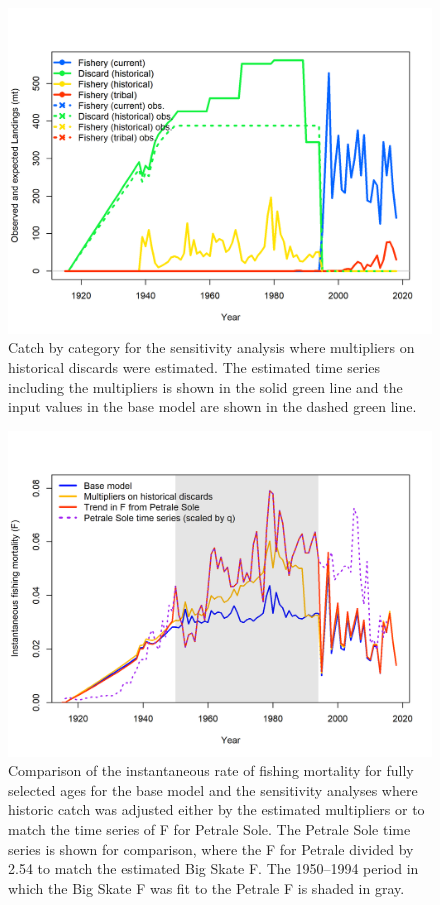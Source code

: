 \documentclass[12pt,]{article}
\begin{document}
\begin{figure}
\centering
\includegraphics{Figures/catch_multiplier_catch_comparison.png}
\caption{Catch by category for the sensitivity analysis where
multipliers on historical discards were estimated. The estimated time
series including the multipliers is shown in the solid green line and
the input values in the base model are shown in the dashed green line.
\label{fig:catch_multiplier_catch_comparison}}
\end{figure}

\begin{figure}
\centering
\includegraphics{Figures/F_comparison.png}
\caption{Comparison of the instantaneous rate of fishing mortality for
fully selected ages for the base model and the sensitivity analyses
where historic catch was adjusted either by the estimated multipliers or
to match the time series of F for Petrale Sole. The Petrale Sole time
series is shown for comparison, where the F for Petrale divided by 2.54
to match the estimated Big Skate F. The 1950--1994 period in which the
Big Skate F was fit to the Petrale F is shaded in gray.
\label{fig:F_comparison}}
\end{figure}
\end{document}
